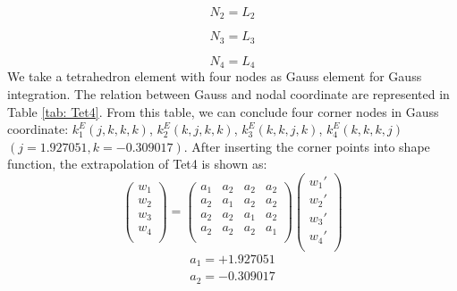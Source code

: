\begin{equation}
N_2 = L_2
\end{equation}

\begin{equation}
N_3 = L_3
\end{equation}

\begin{equation}
N_4 = L_4
\end{equation}
 We take a tetrahedron element with four nodes as Gauss element for Gauss integration. The relation between Gauss and nodal coordinate are represented in Table \ref{tab: Tet4}. From this table, we can conclude four corner nodes in Gauss coordinate: $k_1^E(j, k, k, k)$, $k_2^E(k, j, k, k)$, $k_3^E(k, k, j, k)$, $k_4^E(k, k, k, j)$ $(j=1.927051, k=-0.309017)$. After inserting the corner points into shape function, the extrapolation of Tet4 is shown as:
\begin{equation}
\begin{pmatrix}
w_1 \\
w_2 \\
w_3 \\
w_4 \\
\end{pmatrix} = \begin{pmatrix}
a_1 & a_2 &  a_2 &  a_2      \\[0.3em]
a_2 & a_1 &  a_2 &  a_2      \\[0.3em]
a_2 & a_2 &  a_1 &  a_2      \\[0.3em]
a_2 & a_2 &  a_2 &  a_1      \\[0.3em]
\end{pmatrix} \begin{pmatrix}
{w_1}' \\
{w_2}' \\
{w_3}' \\
{w_4}' \\
\end{pmatrix}
\end{equation}	
\begin{align*}
a_1 = +1.927051 \\
a_2 = -0.309017 \\
\end{align*}


